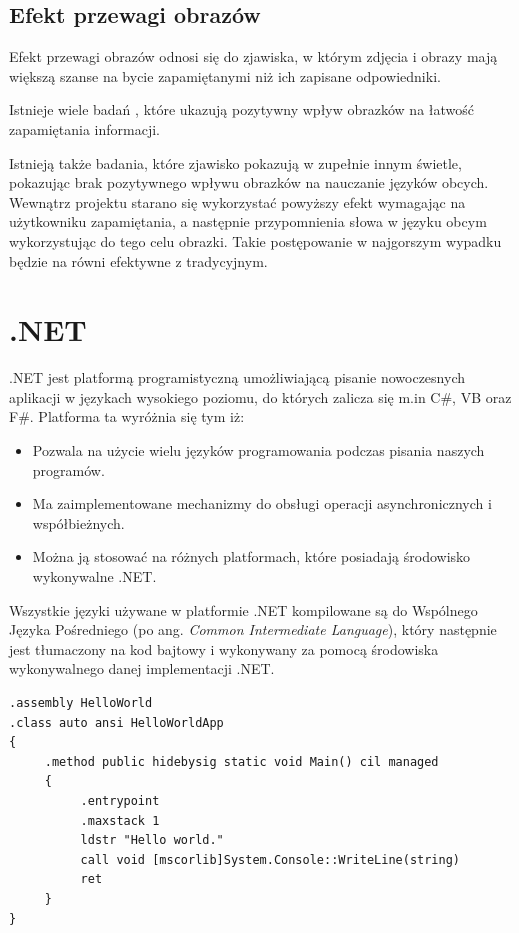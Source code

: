 \section{Efekt przewagi obrazów}

Efekt przewagi obrazów odnosi się do zjawiska, w którym zdjęcia i obrazy mają większą szanse na bycie zapamiętanymi niż ich zapisane odpowiedniki. 

Istnieje wiele badań \cite{PicturesRocks}\cite{SuperPictures}, które ukazują pozytywny wpływ obrazków na łatwość zapamiętania informacji. 

Istnieją także badania, które zjawisko pokazują w zupełnie innym świetle, pokazując brak pozytywnego wpływu obrazków na nauczanie języków obcych\cite{OverConfidence}.
\\
Wewnątrz projektu starano się wykorzystać powyższy efekt wymagając na użytkowniku zapamiętania, a następnie przypomnienia słowa w języku obcym wykorzystując do tego celu obrazki. Takie postępowanie w najgorszym wypadku będzie na równi efektywne z tradycyjnym.







{\let\cleardoublepage\relax \chapter{.NET}}


.NET jest platformą programistyczną umożliwiającą pisanie nowoczesnych aplikacji w językach wysokiego poziomu, do których zalicza się m.in C\#, VB oraz F\#. Platforma ta wyróżnia się tym iż:
\begin{itemize}
	\item Pozwala na użycie wielu języków programowania podczas pisania naszych programów.
	\item Ma zaimplementowane mechanizmy do obsługi operacji asynchronicznych i współbieżnych.
	\item Można ją stosować na różnych platformach, które posiadają środowisko wykonywalne .NET.
\end{itemize}
Wszystkie języki używane w platformie .NET kompilowane są do Wspólnego Języka Pośredniego (po ang. \textit{Common Intermediate Language}), który następnie jest tłumaczony na kod bajtowy i wykonywany za pomocą środowiska wykonywalnego danej implementacji .NET.

\begin{lstlisting}[frame=single, numbers=none,captionpos=b, 
caption={Przykładowy kod aplikacji "Hello World" w języku CIL}]
.assembly HelloWorld
.class auto ansi HelloWorldApp
{
     .method public hidebysig static void Main() cil managed
     {
          .entrypoint
          .maxstack 1
          ldstr "Hello world."
          call void [mscorlib]System.Console::WriteLine(string)
          ret
     }
}
\end{lstlisting}

